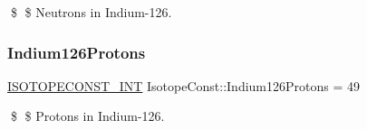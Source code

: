 \$ \$ Neutrons in Indium-\/126. \mbox{\label{group___isotope_const-_indium-_in126_ga490863043867e10a23aada278ff14ce6}} 
\subsubsection{\texorpdfstring{Indium126\+Protons}{Indium126Protons}}
{\footnotesize\ttfamily \mbox{\hyperlink{group___isotope_const-_macros_ga5f18360b3e99483a35c32d789e62621c}{I\+S\+O\+T\+O\+P\+E\+C\+O\+N\+S\+T\+\_\+\+I\+NT}} Isotope\+Const\+::\+Indium126\+Protons = 49}

\$ \$ Protons in Indium-\/126. 